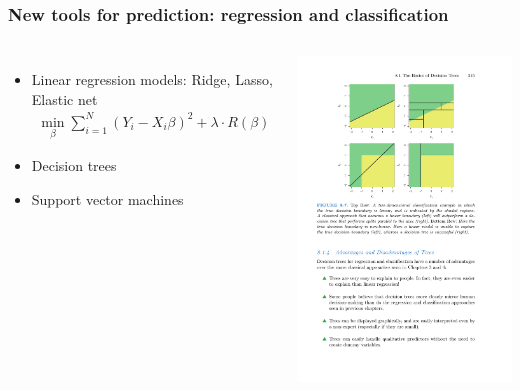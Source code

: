 \documentclass[mathserif, aspectratio=169]{beamer}
\begin{document}
\begin{frame}
	\frametitle{New tools for prediction: regression and classification}
	\begin{columns}[c]
			\begin{itemize}		
				\item Linear regression models: Ridge, Lasso, Elastic net
				\begin{align*}
					\min_\beta \sum_{i=1}^N \left(Y_i - X_i \beta \right)^2+\lambda \cdot R(\beta)
				\end{align*}
				\item Decision trees
				\item Support vector machines
			\end{itemize}
			\includegraphics[width=\textwidth]{tree_vs_linear_for_classification}


\end{columns}
\end{frame}
\end{document}
